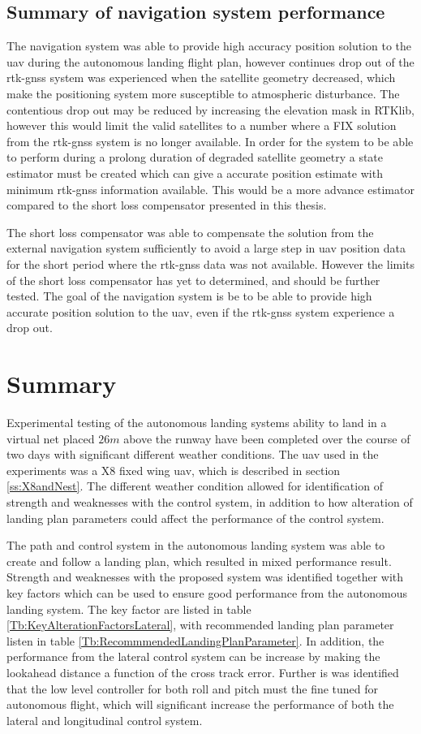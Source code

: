 \subsection{Summary of navigation system performance}
The navigation system was able to provide high accuracy position solution to the \gls{uav} during the autonomous landing flight plan, however continues drop out of the \gls{rtk-gnss} system was experienced when the satellite geometry decreased, which make the positioning system more susceptible to atmospheric disturbance. The contentious drop out may be reduced by increasing the elevation mask in RTKlib, however this would limit the valid satellites to a number where a FIX solution from the \gls{rtk-gnss} system is no longer available. In order for the system to be able to perform during a prolong duration of degraded satellite geometry a state estimator must be created which can give a accurate position estimate with minimum \gls{rtk-gnss} information available. This would be a more advance estimator compared to the short loss compensator presented in this thesis.

The short loss compensator was able to compensate the solution from the external navigation system sufficiently to avoid a large step in \gls{uav} position data for the short period where the \gls{rtk-gnss} data was not available. However the limits of the short loss compensator has yet to determined, and should be further tested. The goal of the navigation system is be to be able to provide high accurate position solution to the \gls{uav}, even if the \gls{rtk-gnss} system experience a drop out.
\section{Summary}
Experimental testing of the autonomous landing systems ability to land in a virtual net placed $26 m $ above the runway have been completed over the course of two days with significant different weather conditions. The \gls{uav} used in the experiments was a X8 fixed wing \gls{uav}, which is described in section \ref{ss:X8andNest}. The different weather condition allowed for identification of strength and weaknesses with the control system, in addition to how alteration of landing plan parameters could affect the performance of the control system.

The path and control system in the autonomous landing system was able to create and follow a landing plan, which resulted in mixed performance result. Strength and weaknesses with the proposed system was identified together with key factors which can be used to ensure good performance from the autonomous landing system. The key factor are listed in table \ref{Tb:KeyAlterationFactorsLateral}, with recommended landing plan parameter listen in table \ref{Tb:RecommmendedLandingPlanParameter}. In addition, the performance from the lateral control system can be increase by making the lookahead distance a function of the cross track error. Further is was identified that the low level controller for both roll and pitch must the fine tuned for autonomous flight, which will significant increase the performance of both the lateral and longitudinal control system.


